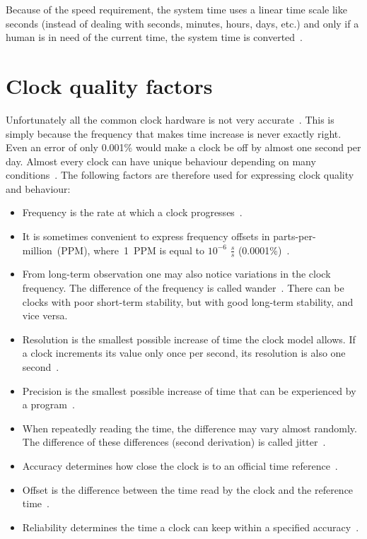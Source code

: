 Because of the speed requirement,
the system time uses a linear time scale like seconds
(instead of dealing with seconds, minutes, hours, days, etc.)
and only if a human is in need of the current time,
the system time is converted~\cite{ntp-faq}.




\section{Clock quality factors}
Unfortunately all the common clock hardware is not very accurate~\cite{ntp-faq}.
This is simply because the frequency that makes time increase is never exactly right.
Even an error of only 0.001\% would make a clock be off by almost one second per day.
Almost every clock can have unique behaviour depending on many conditions~\cite{ntp-faq}.
The following factors are therefore used for expressing clock quality and behaviour:
\begin{itemize}
\item
Frequency is the rate at which a clock progresses~\cite{thesis-sync}.
\item
It is sometimes convenient
to express frequency offsets in parts-per-million~(PPM), where~1~PPM
is equal to $10^{-6}$ $\frac{s}{s}$ (0.0001\%)~\cite{rfc5905}.
\item
From long-term observation one may also notice variations in the clock frequency.
The difference of the frequency is called wander~\cite{ntp-faq}.
There can be clocks with poor short-term stability, but with good long-term stability, and vice versa.
\item
Resolution is the smallest possible increase of time the clock model allows.
If a clock increments its value only once per second, its resolution is also one second~\cite{ntp-faq}.
\item
Precision is the smallest possible increase of time that can be experienced
by a program~\cite{ntp-faq}.
\item
When repeatedly reading the time, the difference may vary almost randomly.
The difference of these differences (second derivation) is called jitter~\cite{ntp-faq}.
\item
Accuracy determines how close the clock is to an official time reference~\cite{ntp-faq}.
\item
Offset is the difference between the time read by the clock and the reference time~\cite{thesis-sync}.
\item
Reliability determines the time a clock can keep within a specified accuracy~\cite{ntp-faq}.
\end{itemize}

